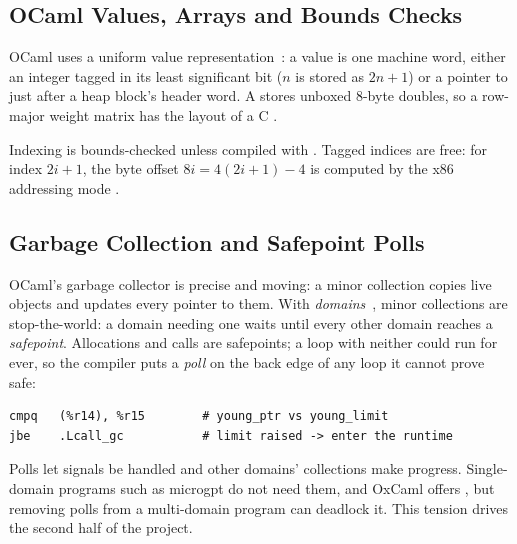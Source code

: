 \subsection{OCaml Values, Arrays and Bounds Checks}
\label{sec:ocaml-values}

OCaml uses a uniform value representation~\cite{minsky2022rwo}: a value is one
machine word, either an integer tagged in its least significant bit ($n$ is
stored as $2n+1$) or a pointer to just after a heap block's header word. A
 stores unboxed 8-byte doubles, so a row-major weight matrix
has the layout of a C .

Indexing  is bounds-checked unless compiled with .
Tagged indices are free: for index $2i+1$, the byte offset $8i = 4(2i+1) - 4$ is
computed by the x86 addressing mode .

\subsection{Garbage Collection and Safepoint Polls}
\label{sec:gc-polls}

OCaml's garbage collector is precise and moving: a minor collection copies live
objects and updates every pointer to them. With
\emph{domains}~\cite{sivaramakrishnan2020retrofitting}, minor collections are
stop-the-world: a domain needing one waits until every other domain reaches a
\emph{safepoint}. Allocations and calls are safepoints; a loop with neither
could run for ever, so the compiler puts a \emph{poll} on the back edge of any
loop it cannot prove safe:

\begin{lstlisting}[language=asmX,caption={A GC safepoint poll on x86-64: compare the young-heap pointer (\%r15) with the limit stored in the domain state (\%r14). The runtime raises the limit above any heap address to request a safepoint, so the next comparison takes the branch.},label=lst:poll,numbers=none]
cmpq   (%r14), %r15        # young_ptr vs young_limit
jbe    .Lcall_gc           # limit raised -> enter the runtime
\end{lstlisting}

Polls let signals be handled and other domains' collections make progress.
Single-domain programs such as microgpt do not need them, and OxCaml offers
, but removing polls from a multi-domain program
can deadlock it. This tension drives the second half of the project.

